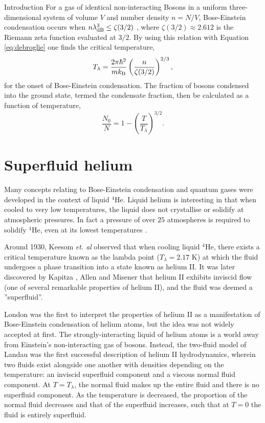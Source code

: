 \begin{chapter}{\label{cha:bose_gases}Introduction}
For a gas of identical non-interacting Bosons in a uniform three-dimensional system of volume $V$ and number density $n=N/V$, Bose-Einstein condensation occurs when $n\lambda_{\rm dB}^3 \leq \zeta(3/2)$ \cite{Pethick,huang1987statistical}, where $\zeta(3/2)\approx2.612$ is the Riemann zeta function evaluated at $3/2$. By using this relation with Equation \ref{eq:debroglie} one finds the critical temperature,
\begin{equation}
T_\lambda = \frac{2\pi\hbar^2}{mk_{\rm B}} \left ( \frac{n}{\zeta(3/2)} \right )^{2/3},
\label{eq:tlambda}
\end{equation}
for the onset of Bose-Einstein condensation. The fraction of bosons condensed into the ground state, termed the condensate fraction, then be calculated as a function of temperature,
\begin{equation}
	\frac{N_0}{N} = 1 - \left( \frac{T}{T_\lambda}\right )^{3/2}.
\end{equation}

\section{Superfluid helium}
Many concepts relating to Bose-Einstein condensation and quantum gases were developed in the context of liquid $^4$He. Liquid helium is interesting in that when cooled to very low temperatures, the liquid does not crystallise or solidify at atmospheric pressures. In fact a pressure of over $25$ atmospheres is required to solidify $^4$He, even at its lowest temperatures \cite{Pethick}. 

Around 1930, Keesom {\it et. al} \cite{Keesom27,Keesom35} observed that when cooling liquid $^4$He, there exists a critical temperature known as the lambda point ($T_\lambda = 2.17$ K) at which the fluid undergoes a phase transition into a state known as helium II. It was later discovered by Kapitza \cite{Kapitza}, Allen and Misener \cite{Allen38} that helium II exhibits inviscid flow (one of several remarkable properties of helium II), and the fluid was deemed a ''superfluid''.

London \cite{London38,London38b} was the first to interpret the properties of helium II as a manifestation of Bose-Einstein condensation of helium atoms, but the idea was not widely accepted at first. The strongly-interacting liquid of helium atoms is a world away from Einstein's non-interacting gas of bosons. Instead, the two-fluid model of Landau \cite{Landau41} was the first successful description of helium II hydrodynamics, wherein two fluids exist alongside one another with densities depending on the temperature: an inviscid superfluid component and a viscous normal fluid component. At $T=T_\lambda$, the normal fluid makes up the entire fluid and there is no superfluid component. As the temperature is decreased, the proportion of the normal fluid decreases and that of the superfluid increases, such that at $T=0$ the fluid is entirely superfluid.


\end{chapter}
